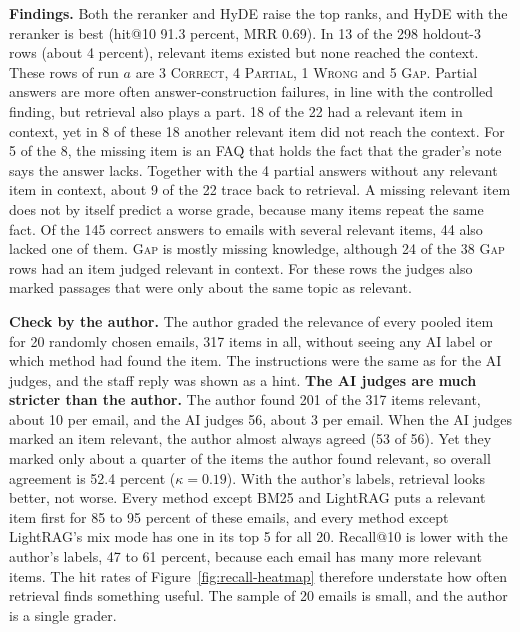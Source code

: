 

\textbf{Findings.} Both the reranker and HyDE raise the top ranks, and HyDE with the reranker is best (hit@10 91.3 percent, MRR 0.69). In 13 of the 298 holdout-3 rows (about 4 percent), relevant items existed but none reached the context. These rows of run $a$ are 3 \textsc{Correct}, 4 \textsc{Partial}, 1 \textsc{Wrong} and 5 \textsc{Gap}. Partial answers are more often answer-construction failures, in line with the controlled finding, but retrieval also plays a part. 18 of the 22 had a relevant item in context, yet in 8 of these 18 another relevant item did not reach the context. For 5 of the 8, the missing item is an FAQ that holds the fact that the grader's note says the answer lacks. Together with the 4 partial answers without any relevant item in context, about 9 of the 22 trace back to retrieval. A missing relevant item does not by itself predict a worse grade, because many items repeat the same fact. Of the 145 correct answers to emails with several relevant items, 44 also lacked one of them. \textsc{Gap} is mostly missing knowledge, although 24 of the 38 \textsc{Gap} rows had an item judged relevant in context. For these rows the judges also marked passages that were only about the same topic as relevant.

\textbf{Check by the author.} The author graded the relevance of every pooled item for 20 randomly chosen emails, 317 items in all, without seeing any AI label or which method had found the item. The instructions were the same as for the AI judges, and the staff reply was shown as a hint. \textbf{The AI judges are much stricter than the author.} The author found 201 of the 317 items relevant, about 10 per email, and the AI judges 56, about 3 per email. When the AI judges marked an item relevant, the author almost always agreed (53 of 56). Yet they marked only about a quarter of the items the author found relevant, so overall agreement is 52.4 percent ($\kappa=0.19$). With the author's labels, retrieval looks better, not worse. Every method except BM25 and LightRAG puts a relevant item first for 85 to 95 percent of these emails, and every method except LightRAG's mix mode has one in its top 5 for all 20. Recall@10 is lower with the author's labels, 47 to 61 percent, because each email has many more relevant items. The hit rates of Figure~\ref{fig:recall-heatmap} therefore understate how often retrieval finds something useful. The sample of 20 emails is small, and the author is a single grader.

